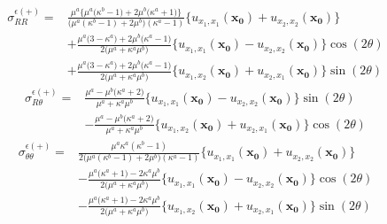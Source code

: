 \begin{align}
	\sigma_{RR}^{\epsilon(+)}
	=&\frac{ \mu^{a}\{\mu^{a}\bigl(\kappa^{b}-1\bigr)+2\mu^{b}\bigl(\kappa^{a}+1\bigr)\}　}
		{\bigl(\mu^{a}(\kappa^{b}-1)+2\mu^{b}\bigr)(\kappa^{a}-1)}
	\bigl\{u_{x_{1},x_{1}}(\bm{x_{0}})+u_{x_{2},x_{2}}(\bm{x_{0}})\bigr\}
	\nonumber
	\\
	&+\frac{\mu^{a}\bigl(3-\kappa^{a}\bigr)+2\mu^{b}\bigl(\kappa^{a}-1\bigr)}{2\bigl(\mu^{a}+\kappa^{a}\mu^{b}\bigr)}
	\bigl\{u_{x_{1},x_{1}}(\bm{x_{0}})-u_{x_{2},x_{2}}(\bm{x_{0}})\bigr\}\cos(2\theta)
	\nonumber
	\\
	&+\frac{\mu^{a}\bigl(3-\kappa^{a}\bigr)+2\mu^{b}\bigl(\kappa^{a}-1\bigr)}{2\bigl(\mu^{a}+\kappa^{a}\mu^{b}\bigr)}
	\bigl\{u_{x_{1},x_{2}}(\bm{x_{0}})+u_{x_{2},x_{1}}(\bm{x_{0}})\bigr\}\sin(2\theta)
	\label{eq:eRROutEpsSol}
\end{align}
\begin{align}
	\sigma_{R\theta}^{\epsilon(+)}
	=&\frac{\mu^{a}-\mu^{b}\bigl(\kappa^{a}+2\bigr)}{\mu^{a}+\kappa^{a}\mu^{b}}
	\bigl\{u_{x_{1},x_{1}}(\bm{x_{0}})-u_{x_{2},x_{2}}(\bm{x_{0}})\bigr\}\sin(2\theta)
	\nonumber
	\\
	&-\frac{\mu^{a}-\mu^{b}\bigl(\kappa^{a}+2\bigr)}{\mu^{a}+\kappa^{a}\mu^{b}}
	\bigl\{u_{x_{1},x_{2}}(\bm{x_{0}})+u_{x_{2},x_{1}}(\bm{x_{0}})\bigr\}\cos(2\theta)
	\label{eq:eRThOutEpsSol}
\end{align}
\begin{align}
	\sigma_{\theta\theta}^{\epsilon(+)}
	=&\frac{\mu^{a}\kappa^{a}(\kappa^{b}-1)}
	{2\bigl(\mu^{a}(\kappa^{b}-1)+2\mu^{b}\bigr)(\kappa^{a}-1)}
	\bigl\{u_{x_{1},x_{1}}(\bm{x_{0}})+u_{x_{2},x_{2}}(\bm{x_{0}})\bigr\}
	\nonumber
	\\
	&-\frac{\mu^{a}\bigl(\kappa^{a}+1\bigr)-2\kappa^{a}\mu^{b}}{2\bigl(\mu^{a}+\kappa^{a}\mu^{b}\bigr)}
	\bigl\{u_{x_{1},x_{1}}(\bm{x_{0}})-u_{x_{2},x_{2}}(\bm{x_{0}})\bigr\}\cos(2\theta)
	\nonumber
	\\
	&-\frac{\mu^{a}\bigl(\kappa^{a}+1\bigr)-2\kappa^{a}\mu^{b}}{2\bigl(\mu^{a}+\kappa^{a}\mu^{b}\bigr)}
	\bigl\{u_{x_{1},x_{2}}(\bm{x_{0}})+u_{x_{2},x_{1}}(\bm{x_{0}})\bigr\}\sin(2\theta)
	\label{eq:eThThOutEpsSol}
\end{align}
